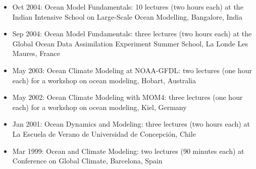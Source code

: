 \begin{itemize}[leftmargin=*]
\item Oct 2004: {\sc Ocean Model Fundamentals}: 10 lectures (two hours each) at the {\sc Indian Intensive School on Large-Scale Ocean Modelling}, Bangalore, India

\item Sep 2004: {\sc Ocean Model Fundamentals}: three lectures (two hours each) at the {\sc Global Ocean Data Assimilation Experiment  Summer School}, La Londe Les Maures, France

\item May 2003: {\sc Ocean Climate Modeling at NOAA-GFDL}: two lectures (one hour each) for a workshop on ocean modeling, Hobart, Australia

\item May 2002: {\sc Ocean Climate Modeling with MOM4}: three lectures (one hour each) for a workshop on ocean modeling, Kiel, Germany

\item Jan 2001: {\sc Ocean Dynamics and Modeling}: three lectures (two hours each) at La Escuela de Verano de Universidad de Concepci\'on, Chile

\item Mar 1999: {\sc Ocean and Climate Modeling}: two lectures (90 minutes each) at {\sc Conference on Global Climate}, Barcelona,
Spain

\end{itemize}








